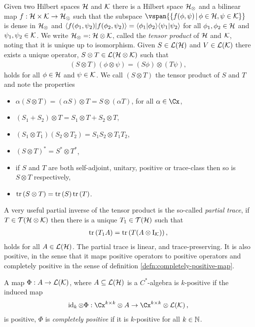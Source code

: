 Given two Hilbert spaces $\mathcal{H}$ and $\mathcal{K}$ there is a Hilbert space $\mathcal{H}_\otimes$ and a bilinear map $f:\mathcal{H}\times\mathcal{K}\to\mathcal{H}_\otimes$ such that the subspace $\vspan{\sbuild{f(\phi,\psi)}{\phi\in\hcal, \psi\in\kcal}}$ is dense in $\mathcal{H}_\otimes$ and 
$\langle f(\phi_1,\psi_2)|f(\phi_2,\psi_2)\rangle = \langle \phi_1|\phi_2\rangle\langle \psi_1|\psi_2\rangle$ for all $\phi_1,\phi_2\in\mathcal{H}$ and $\psi_1,\psi_2\in\mathcal{K}$. We write $\mathcal{H}_\otimes =: \mathcal{H}\otimes\mathcal{K}$, called the \emph{tensor product} of $\mathcal{H}$ and $\mathcal{K}$, noting that it is unique up to isomorphism. Given $S\in\bops[\hcal]$ and $V\in\bops[\kcal]$ there exists a unique operator, $S\otimes T\in\bops[\hcal\otimes\kcal]$ such that 
\begin{align}
  (S\otimes T)(\phi\otimes\psi) = (S\phi)\otimes(T\psi),
\end{align}
holds for all $\phi\in\mathcal{H}$ and $\psi\in\mathcal{K}$. We call  $(S\otimes T)$ the tensor product of $S$ and $T$ and note the properties
\begin{itemize}
  \item $\alpha(S\otimes T) = (\alpha S)\otimes T = S\otimes(\alpha T)$, for all $\alpha\in\Cx$,
  \item $(S_1 + S_2)\otimes T = S_1\otimes T + S_2 \otimes T$,
  \item $(S_1\otimes T_1)(S_2\otimes T_2) = S_1S_2 \otimes T_1 T_2$,
  \item $(S\otimes T)^* = S^*\otimes T^*$,
  \item if $S$ and $T$ are both self-adjoint, unitary, positive or trace-class then so is $S\otimes T$ respectively,
  \item $\operatorname{tr}\left( S\otimes T \right) = \operatorname{tr}\left( S \right)\operatorname{tr}\left( T \right)$.
\end{itemize}
A very useful partial inverse of the tensor product is the so-called \emph{partial trace}, if $T\in\trops[\hcal\otimes\kcal]$ then there is a unique $T_1\in\trops[\hcal]$ such that
\begin{align}
  \operatorname{tr}\left( T_1 A \right) = \operatorname{tr}\left( T(A\otimes \operatorname{I}_{\mathcal{K}}) \right),
\end{align}
holds for all $A\in \bops[\hcal]$. The partial trace is linear, and trace-preserving. It is also positive, in the sense that it maps positive operators to positive operators and completely positive in the sense of definition \ref{defn:completely-positive-map}.

\begin{defn}\label{defn:completely-positive-map}
  A map $\Phi:A\to \bops[\kcal]$, where $A\subseteq \bops[\hcal]$ is a $C^*$-algebra is $k$-positive if the induced map
  \begin{align}
    \operatorname{id}_k\otimes \Phi:\Cx^{k\times k}\otimes A\to \Cx^{k\times k}\otimes\bops[\kcal],
  \end{align}
  is positive, $\Phi$ is \emph{completely positive} if it is $k$-positive for all $k\in\mathbb{N}$.
\end{defn}

